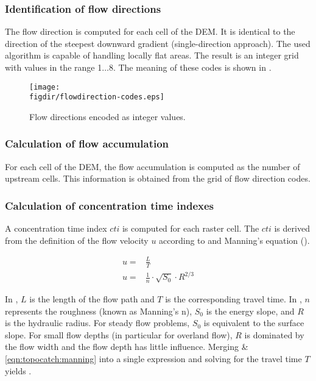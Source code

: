 \subsubsection*{Identification of flow directions}
The flow direction is computed for each cell of the DEM. It is identical to the direction of the steepest downward gradient (single-direction approach). The used algorithm is capable of handling locally flat areas. The result is an integer grid with values in the range 1$\ldots$8. The meaning of these codes is shown in .

\begin{figure}
  \centering
  \texttt{[image: \\figdir/flowdirection-codes.eps]}
  \caption{Flow directions encoded as integer values. \label{fig:flowdirection-codes}}
\end{figure}

\subsubsection*{Calculation of flow accumulation}
For each cell of the DEM, the flow accumulation is computed as the number of upstream cells. This information is obtained from the grid of flow direction codes.

\subsubsection*{Calculation of concentration time indexes}
A concentration time index $cti$ is computed for each raster cell. The $cti$ is derived from the definition of the flow velocity $u$ according to  and Manning's equation ().

\begin{align}
  u= & \frac{L}{T} \label{eqn:topocatch:velocity} \\
  u= & \frac{1}{n} \cdot \sqrt{S_0} \cdot R^{2/3} \label{eqn:topocatch:manning}
\end{align}

In , $L$ is the length of the flow path and $T$ is the corresponding travel time. In , $n$ represents the roughness (known as Manning's n), $S_0$ is the energy slope, and $R$ is the hydraulic radius. For steady flow problems, $S_0$ is equivalent to the surface slope. For small flow depths (in particular for overland flow), $R$ is dominated by the flow width and the flow depth has little influence. Merging  \& \ref{eqn:topocatch:manning} into a single expression and solving for the travel time $T$ yields .

